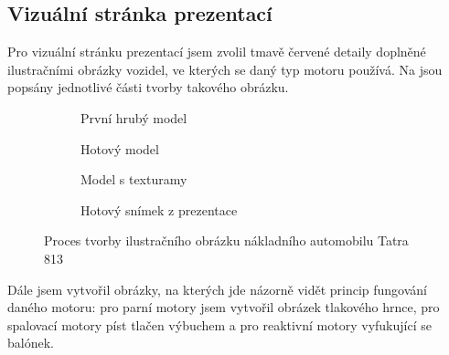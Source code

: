 \subsection{Vizuální stránka prezentací}
{Pro vizuální stránku prezentací jsem zvolil tmavě červené detaily doplněné ilustračními obrázky vozidel, ve kterých se daný typ motoru používá. Na  jsou popsány jednotlivé části tvorby takového obrázku.}
\begin{figure}[H]
    \begin{subfigure}{0.5\textwidth}
        \centering
        \setlength{\fboxsep}{0pt}
        \caption{První hrubý model}
    \end{subfigure}
    \begin{subfigure}{0.5\linewidth}
        \centering
        \setlength{\fboxsep}{0pt}
        \caption{Hotový model}
    \end{subfigure}
    \begin{subfigure}{0.5\linewidth}
        \centering
        \setlength{\fboxsep}{0pt}
        \caption{Model s texturamy}
    \end{subfigure}
    \begin{subfigure}{0.5\linewidth}
        \centering
        \setlength{\fboxsep}{0pt}
        \caption{Hotový snímek z prezentace}
    \end{subfigure}
    \caption{Proces tvorby ilustračního obrázku nákladního automobilu Tatra 813 \jaObr}
    \label{obr:tatra813}
\end{figure}
{Dále jsem vytvořil obrázky, na kterých jde názorně vidět princip fungování daného motoru: pro parní motory jsem vytvořil obrázek tlakového hrnce, pro spalovací motory píst tlačen výbuchem a pro reaktivní motory vyfukující se balónek.}
